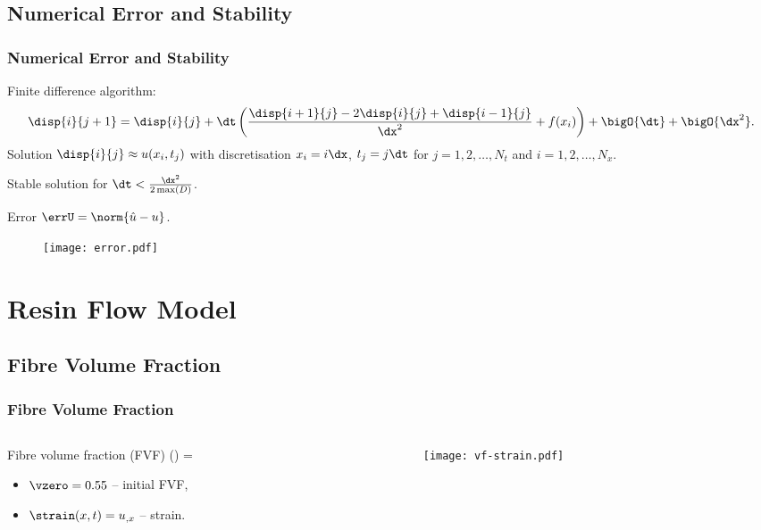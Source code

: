 \documentclass[compress]{beamer}%
\newenvironment{myalign}
{\align\color{\notcolor}}
{
  \nonumber
  \endalign
  \vspace{-1em}
}
\begin{document}
\subsection{Numerical Error and Stability}
\begin{frame}
\frametitle{Numerical Error and Stability}

Finite difference algorithm:
\begin{align}
  \disp{i}{j+1}  =   \disp{i}{j} + \dt\left(\frac{\disp{i+1}{j} - 2\disp{i}{j} + \disp{i-1}{j}}{\dx^2}   + f(x_i) \right) +
\bigO{\dt} + \bigO{\dx^2}. \nonumber
   \label{eq:findiff-alg}
\end{align}
%
Solution $\disp{i}{j}\approx u(x_i,t_j)$ with discretisation
$ x_i = i\dx$, $ t_j = j\dt$ for $j = 1, 2, \dots, N_t$ and
$i = 1, 2, \dots, N_x$.

Stable solution for $  \dt < \frac{\dx^2}{2\max(D)}$.

Error $\errU = \norm{\hat{u} - u}$.
%
\begin{figure}
  \centering
  \texttt{[image: error.pdf]}
  \label{fig:error-analysis}
\end{figure}

\end{frame}


\section{Resin Flow Model}



\subsection{Fibre Volume Fraction}

\begin{frame}
  \frametitle{Fibre Volume Fraction}

  \begin{columns}
    \begin{column}{0.6\linewidth}
      Fibre volume fraction (FVF)
        \begin{myalign} 
          \vfrac(\strain) = 
        \end{myalign}
        \begin{itemize}
        \item $\vzero=0.55$ -- initial FVF,
        \item $\strain(x,t) = u_{,x}$ -- strain.
        \end{itemize}
    \end{column}
    \begin{column}{0.4\linewidth}
      \texttt{[image: vf-strain.pdf]}
    \end{column}
  \end{columns}
\end{frame}
\end{document}
